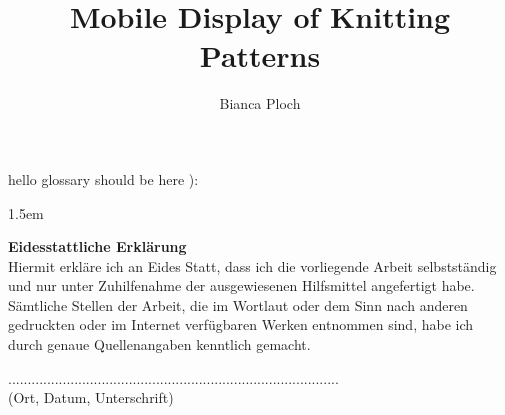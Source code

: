 \author{Bianca Ploch}
\title{Mobile Display of Knitting Patterns}




\makeglossaries




% 






\newpage
hello glossary should be here ):
\printglossary[type=\acronymtype,title={Abbreviations}]

\newpage 
\sloppy %
\emergencystretch 1.5em %
\listoffigures

\newpage
\lstlistoflistings

\printbibliography


%    

\newpage
\thispagestyle{empty}

\noindent \textbf{Eidesstattliche Erklärung}\\

\noindent Hiermit erkläre ich an Eides Statt, dass ich die vorliegende Arbeit selbstständig und nur unter
Zuhilfenahme der ausgewiesenen Hilfsmittel angefertigt habe.
Sämtliche Stellen der Arbeit, die im Wortlaut oder dem Sinn nach anderen gedruckten oder
im Internet verfügbaren Werken entnommen sind, habe ich durch genaue Quellenangaben
kenntlich gemacht.

\vspace*{1.5cm}
\noindent .....................................................................................\\
(Ort, Datum, Unterschrift)


